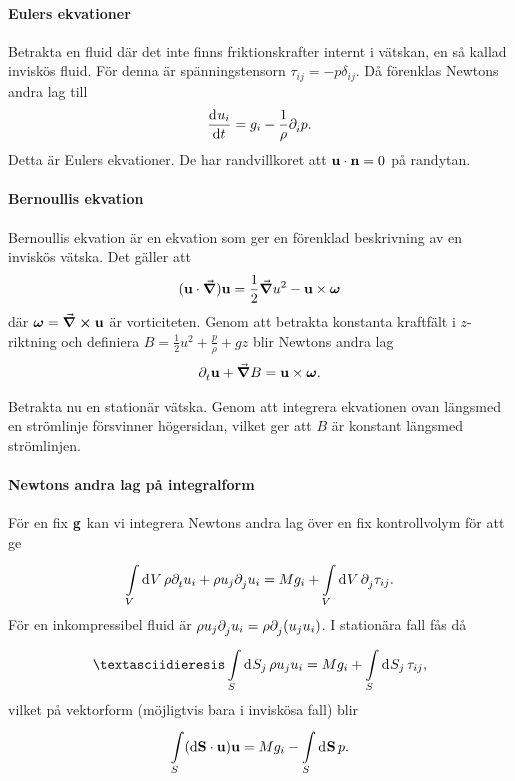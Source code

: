 \paragraph{Eulers ekvationer}
Betrakta en fluid där det inte finns friktionskrafter internt i vätskan, en så kallad inviskös fluid. För denna är spänningstensorn $\tau_{ij} = -p\delta_{ij}$. Då förenklas Newtons andra lag till
\begin{align*}
	\dv[]{u_{i}}{t} = g_{i} - \frac{1}{\rho}\partial_{i}^{}p.
\end{align*}
Detta är Eulers ekvationer. De har randvillkoret att $\vb{u}\cdot\vb{n} = 0$ på randytan.

\paragraph{Bernoullis ekvation}
Bernoullis ekvation är en ekvation som ger en förenklad beskrivning av en inviskös vätska. Det gäller att
\begin{align*}
	(\vb{u}\cdot\grad)\vb{u} = \frac{1}{2}\grad{u^{2}} - \vb{u}\times\vb*{\omega}
\end{align*}
där $\vb*{\omega} = \curl{\vb{u}}$ är vorticiteten. Genom att betrakta konstanta kraftfält i $z$-riktning och definiera $B = \frac{1}{2}u^{2} + \frac{p}{\rho} + gz$ blir Newtons andra lag
\begin{align*}
	\partial_{t}^{}\vb{u} + \grad{B} = \vb{u}\times\vb*{\omega}.
\end{align*}

Betrakta nu en stationär vätska. Genom att integrera ekvationen ovan längsmed en strömlinje försvinner högersidan, vilket ger att $B$ är konstant längsmed strömlinjen.

\paragraph{Newtons andra lag på integralform}
För en fix $\vb{g}$ kan vi integrera Newtons andra lag över en fix kontrollvolym för att ge
\begin{align*}
	\int\limits_{V}^{}\dd[]{V}\rho\partial_{t}^{}u_{i} + \rho u_{j}\partial_{j}^{}u_{i} = Mg_{i} + \int\limits_{V}^{}\dd[]{V}\partial_{j}^{}\tau_{ij}.
\end{align*}
För en inkompressibel fluid är $\rho u_{j}\partial_{j}^{}u_{i} = \rho \partial_{j}^{}(u_{j}u_{i})$. I stationära fall fås då
\begin{align*}
¨	\integ{S}{}{S_{j}}{\rho u_{j}u_{i}} = Mg_{i} + \integ{S}{}{S_{j}}{\tau_{ij}},
\end{align*}
vilket på vektorform (möjligtvis bara i inviskösa fall) blir
\begin{align*}
	\int\limits_{S}(\dd{\vb{S}}\cdot\vb{u})\vb{u} = Mg_{i} - \int\limits_{S}^{}\dd[]{\vb{S}}p.
\end{align*}

